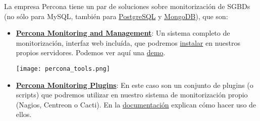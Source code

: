 La empresa Percona tiene un par de soluciones sobre monitorización de SGBDs (no sólo para MySQL, también para \href{https://www.postgresql.org/}{PostgreSQL} y \href{https://www.mongodb.com/}{MongoDB}), que son:
\begin{itemize}
    \item \href{https://www.percona.com/software/database-tools/percona-monitoring-and-management}{\textbf{Percona Monitoring and Management}}: Un sistema completo de monitorización, interfaz web incluída, que podremos \href{https://www.percona.com/software/pmm/quickstart}{instalar} en nuestros propios servidores. Podemos ver aquí una \href{https://pmmdemo.percona.com/graph/}{demo}.

    \texttt{[image: percona\_tools.png]}

    \item \href{https://www.percona.com/software/database-tools/percona-monitoring-plugins}{\textbf{Percona Monitoring Plugins}}: En este caso son un conjunto de plugins (o scripts) que podremos utilizar en nuestro sistema de monitorización propio (Nagios, Centreon o Cacti). En la \href{https://www.percona.com/doc/percona-monitoring-plugins/LATEST/index.html}{documentación} explican cómo hacer uso de ellos.
\end{itemize}

\fi
